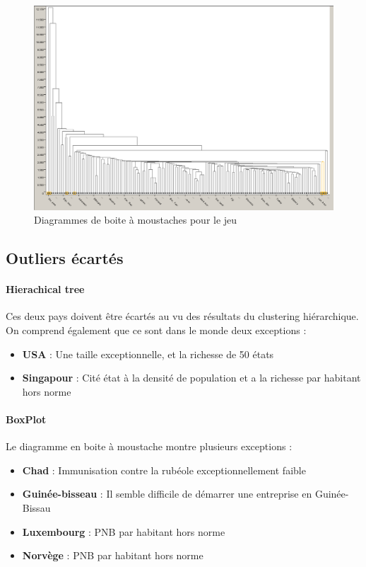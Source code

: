\begin{figure}[H]
	\begin{center}
		\includegraphics[scale=0.5]{Image/DendogrammeOutliers}
		\caption{Diagrammes de boite à moustaches pour le jeu \jeuc}
	\end{center}
\end{figure}

\subsection{Outliers écartés}

\paragraph{Hierachical tree} Ces deux pays doivent être écartés au vu des résultats du clustering hiérarchique. On comprend également que ce sont dans le monde deux exceptions : 
\begin{itemize}
	\item \textbf{USA} : Une taille exceptionnelle, et la richesse de 50 états
	\item \textbf{Singapour} : Cité état à la densité de population et a la richesse par habitant hors norme 
\end{itemize}

\paragraph{BoxPlot}
Le diagramme en boite à moustache montre plusieurs exceptions : 
\begin{itemize}
	\item \textbf{Chad} : Immunisation contre la rubéole exceptionnellement faible
	\item \textbf{Guinée-bisseau} : Il semble difficile de démarrer une entreprise en Guinée-Bissau
	\item \textbf{Luxembourg} : PNB par habitant hors norme
	\item \textbf{Norvège} : PNB par habitant hors norme
\end{itemize}

